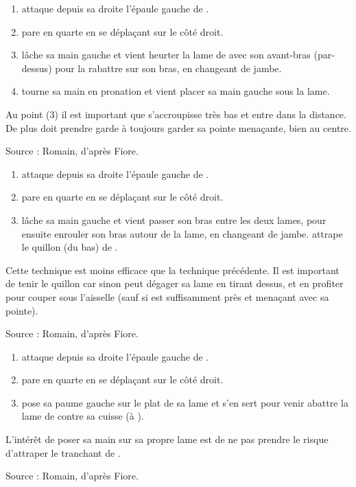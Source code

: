 \begin{technique}

\begin{enumerate}
	\item \A attaque depuis sa droite l'épaule gauche de \D.
	\item \D pare en quarte en se déplaçant sur le côté droit.
	\item \D lâche sa main gauche et vient heurter la lame de \A avec son avant-bras (par-dessus) pour la rabattre sur son bras, en changeant de jambe.
	\item \D tourne sa main en pronation et vient placer sa main gauche sous la lame.
\end{enumerate}

Au point (3) il est important que \D s'accroupisse très bas et entre dans la distance.
De plus \D doit prendre garde à toujours garder sa pointe menaçante, bien au centre.

Source : Romain, d'après Fiore.

\end{technique}


\begin{technique}

\begin{enumerate}
	\item \A attaque depuis sa droite l'épaule gauche de \D.
	\item \D pare en quarte en se déplaçant sur le côté droit.
	\item \D lâche sa main gauche et vient passer son bras entre les deux lames, pour ensuite enrouler son bras autour de la lame, en changeant de jambe. \D attrape le quillon (du bas) de \A.
\end{enumerate}

Cette technique est moins efficace que la technique précédente.
Il est important de tenir le quillon car sinon \A peut dégager sa lame en tirant dessus, et en profiter pour couper sous l'aisselle (sauf si \D est suffisamment près et menaçant avec sa pointe).

Source : Romain, d'après Fiore.

\end{technique}


\begin{technique}

\begin{enumerate}
	\item \A attaque depuis sa droite l'épaule gauche de \D.
	\item \D pare en quarte en se déplaçant sur le côté droit.
	\item \D pose sa paume gauche sur le plat de sa lame et s'en sert pour venir abattre la lame de \A contre sa cuisse (à \D).
\end{enumerate}

L'intérêt de poser sa main sur sa propre lame est de ne pas prendre le risque d'attraper le tranchant de \A.

Source : Romain, d'après Fiore.

\end{technique}


